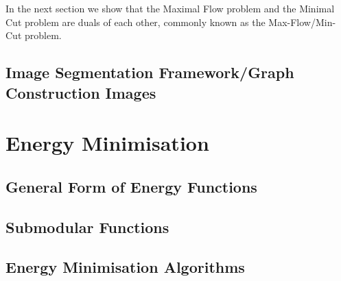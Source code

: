 In the next section we show that the Maximal Flow problem and the Minimal Cut problem are duals of each other, commonly known as the Max-Flow/Min-Cut problem.


\subsection{Image Segmentation Framework/Graph Construction Images}
\label{sec:GraphCutFramework}


\section{Energy Minimisation}
\label{sec:EnergyMinimisation}


\subsection{General Form of Energy Functions}
\label{sec:GeneralEnergyFunctions}


\subsection{Submodular Functions}
\label{sec:Submodular Functions}


\subsection{Energy Minimisation Algorithms}
\label{sec:MaxFlowMinCutAlgoithms}

